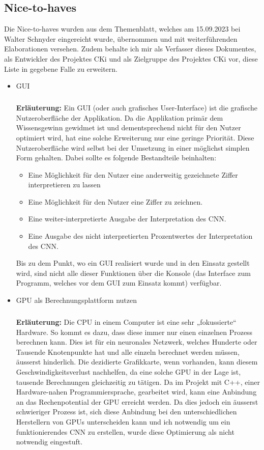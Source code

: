 \subsection{Nice-to-haves}
\label{sec:AnalyseNiceToHaveS}
Die Nice-to-haves wurden aus dem Themenblatt, welches am 15.09.2023 bei Walter Schnyder eingereicht wurde, übernommen und mit weiterführenden Elaborationen versehen. Zudem behalte ich mir als Verfasser dieses Dokumentes, als Entwickler des Projektes CKi und als Zielgruppe des Projektes CKi vor, diese Liste in gegebene Falle zu erweitern.

\begin{itemize}
	\item GUI
	\subparagraph{}
	\textbf{Erläuterung:}
	Ein GUI (oder auch grafisches User-Interface) ist die grafische Nutzeroberfläche der Applikation. Da die Applikation primär dem Wissensgewinn gewidmet ist und dementsprechend nicht für den Nutzer optimiert wird, hat eine solche Erweiterung nur eine geringe Priorität. Diese Nutzeroberfläche wird selbst bei der Umsetzung in einer möglichst simplen Form gehalten. Dabei sollte es folgende Bestandteile beinhalten:
	\begin{itemize}
		\item Eine Möglichkeit für den Nutzer eine anderweitig gezeichnete Ziffer interpretieren zu lassen
		\item Eine Möglichkeit für den Nutzer eine Ziffer zu zeichnen.
		\item Eine weiter-interpretierte Ausgabe der Interpretation des CNN.
		\item Eine Ausgabe des nicht interpretierten Prozentwertes der Interpretation des CNN.
	\end{itemize}
	Bis zu dem Punkt, wo ein GUI realisiert wurde und in den Einsatz gestellt wird, sind nicht alle dieser Funktionen über die Konsole (das Interface zum Programm, welches vor dem GUI zum Einsatz kommt) verfügbar.
	
	\item GPU als Berechnungsplattform nutzen
	\subparagraph{}
	\textbf{Erläuterung:}
	Die CPU in einem Computer ist eine sehr „fokussierte“ Hardware. So kommt es dazu, dass diese immer nur einen einzelnen Prozess berechnen kann. Dies ist für ein neuronales Netzwerk, welches Hunderte oder Tausende Knotenpunkte hat und alle einzeln berechnet werden müssen, äusserst hinderlich. Die dezidierte Grafikkarte, wenn vorhanden, kann diesem Geschwindigkeitsverlust nachhelfen, da eine solche GPU in der Lage ist, tausende Berechnungen gleichzeitig zu tätigen.
	Da im Projekt mit C++, einer Hardware-nahen Programmiersprache, gearbeitet wird, kann eine Anbindung an das Rechenpotential der GPU erreicht werden. Da dies jedoch ein äusserst schwieriger Prozess ist, sich diese Anbindung bei den unterschiedlichen Herstellern von GPUs unterscheiden kann und ich notwendig um ein funktionierendes CNN zu erstellen, wurde diese Optimierung als nicht notwendig eingestuft.
\end{itemize}

